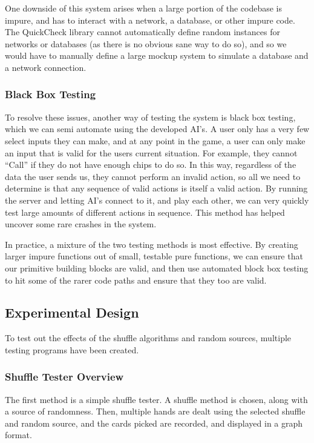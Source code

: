 One downside of this system arises when a large portion of the codebase is
impure, and has to interact with a network, a database, or other impure code.
The QuickCheck library cannot automatically define random instances for
networks or databases (as there is no obvious sane way to do so), and so we
would have to manually define a large mockup system to simulate a database
and a network connection.

\subsubsection{Black Box Testing}

To resolve these issues, another way of testing the system is black box
testing, which we can semi automate using the developed AI's. A user only
has a very few select inputs they can make, and at any point in the game,
a user can only make an input that is valid for the users current situation.
For example, they cannot ``Call'' if they do not have enough chips to do so.
In this way, regardless of the data the user sends us, they cannot perform
an invalid action, so all we need to determine is that any sequence of valid
actions is itself a valid action. By running the server and letting AI's
connect to it, and play each other, we can very quickly test large amounts
of different actions in sequence. This method has helped uncover some rare
crashes in the system.

In practice, a mixture of the two testing methods is most effective. By
creating larger impure functions out of small, testable pure functions, we
can ensure that our primitive building blocks are valid, and then use automated
block box testing to hit some of the rarer code paths and ensure that they
too are valid.

\subsection{Experimental Design}
To test out the effects of the shuffle algorithms and random sources, multiple
testing programs have been created.

\subsubsection{Shuffle Tester Overview}

The first method is a simple shuffle
tester. A shuffle method is chosen, along with a source of randomness. Then,
multiple hands are dealt using the selected shuffle and random source, and
the cards picked are recorded, and displayed in a graph format.

